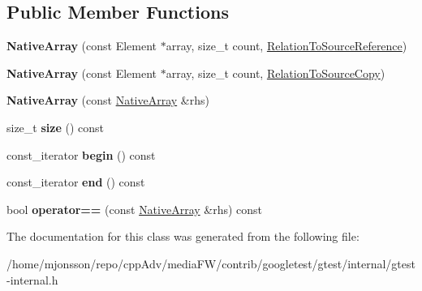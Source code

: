 \subsection*{Public Member Functions}
\begin{DoxyCompactItemize}
\item 
\mbox{\label{classtesting_1_1internal_1_1NativeArray_a52b3689c62532703d11e9d82939a7141}} 
{\bfseries Native\+Array} (const Element $\ast$array, size\+\_\+t count, \hyperlink{structtesting_1_1internal_1_1RelationToSourceReference}{Relation\+To\+Source\+Reference})
\item 
\mbox{\label{classtesting_1_1internal_1_1NativeArray_ac184ee5741af5be3402213819c834405}} 
{\bfseries Native\+Array} (const Element $\ast$array, size\+\_\+t count, \hyperlink{structtesting_1_1internal_1_1RelationToSourceCopy}{Relation\+To\+Source\+Copy})
\item 
\mbox{\label{classtesting_1_1internal_1_1NativeArray_abb346ac3040f5da733f594cc2d5958bc}} 
{\bfseries Native\+Array} (const \hyperlink{classtesting_1_1internal_1_1NativeArray}{Native\+Array} \&rhs)
\item 
\mbox{\label{classtesting_1_1internal_1_1NativeArray_af96a4a5ca0cdd5d163c47a081f08bd89}} 
size\+\_\+t {\bfseries size} () const
\item 
\mbox{\label{classtesting_1_1internal_1_1NativeArray_a3046d93cfa23097e7b7c91f5f982dc78}} 
const\+\_\+iterator {\bfseries begin} () const
\item 
\mbox{\label{classtesting_1_1internal_1_1NativeArray_ae1cda748e49c6906421c6183c4d07c5a}} 
const\+\_\+iterator {\bfseries end} () const
\item 
\mbox{\label{classtesting_1_1internal_1_1NativeArray_a81b90f5739ed812610e68dc34c9e3850}} 
bool {\bfseries operator==} (const \hyperlink{classtesting_1_1internal_1_1NativeArray}{Native\+Array} \&rhs) const
\end{DoxyCompactItemize}


The documentation for this class was generated from the following file\+:\begin{DoxyCompactItemize}
\item 
/home/mjonsson/repo/cpp\+Adv/media\+F\+W/contrib/googletest/gtest/internal/gtest-\/internal.\+h\end{DoxyCompactItemize}
